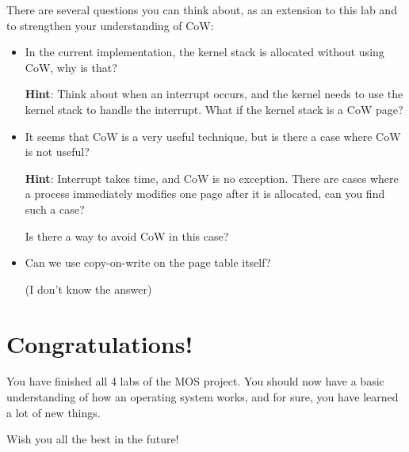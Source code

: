 There are several questions you can think about, as an extension to this lab and to
strengthen your understanding of CoW:

\begin{itemize}
    \item In the current implementation, the kernel stack is allocated without
          using CoW, why is that?

          \textbf{Hint}: Think about when an interrupt occurs, and the kernel
          needs to use the kernel stack to handle the interrupt. What if the
          kernel stack is a CoW page?

    \item It seems that CoW is a very useful technique, but is there a case
          where CoW is not useful?

          \textbf{Hint}: Interrupt takes time, and CoW is no exception.
          There are cases where a process immediately modifies one page after it is
          allocated, can you find such a case?

          Is there a way to avoid CoW in this case?

    \item Can we use copy-on-write on the page table itself?

          (I don't know the answer)
\end{itemize}

\section{Congratulations!}

You have finished all 4 labs of the MOS project. You should now have a basic
understanding of how an operating system works, and for sure, you have
learned a lot of new things.

Wish you all the best in the future!

